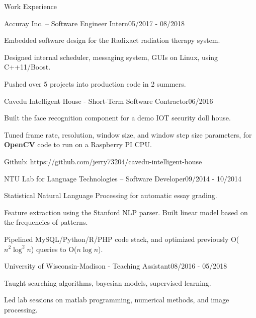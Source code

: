 \documentclass{resume} %
\begin{document}
\begin{rSection}{Work Experience}

\begin{rSubsection}{Accuray Inc. -- Software Engineer Intern}{05/2017 - 08/2018}{}{}%
\item Embedded software design for the Radixact radiation therapy system.
\item Designed internal scheduler, messaging system, GUIs on Linux, using C++11/Boost.
\item Pushed over 5 projects into production code in 2 summers.
\end{rSubsection}

\begin{rSubsection}{Cavedu Intelligent House - Short-Term Software Contractor}{06/2016}{}{}%
\item Built the face recognition component for a demo IOT security doll house.
\item Tuned frame rate, resolution, window size, and window step size parameters, for {\bf OpenCV} code to run on a Raspberry PI CPU.
\item Github: https://github.com/jerry73204/cavedu-intelligent-house
\end{rSubsection}


\begin{rSubsection}{NTU Lab for Language Technologies -- Software Developer}{09/2014 - 10/2014}{}{}%
\item Statistical Natural Language Processing for automatic essay grading.
\item Feature extraction using the Stanford NLP parser. Built linear model based on the frequencies of patterns.
\item Pipelined MySQL/Python/R/PHP code stack, and optimized previously O($n^2\log^2n$) queries to O($n\log n$).
\end{rSubsection}

\begin{rSubsection}{University of Wisconsin-Madison - Teaching Assistant}{08/2016 - 05/2018}{}{}%
\item Taught searching algorithms, bayesian models, supervised learning.
\item Led lab sessions on matlab programming, numerical methods, and image processing.
\end{rSubsection}


\end{rSection}
\end{document}
